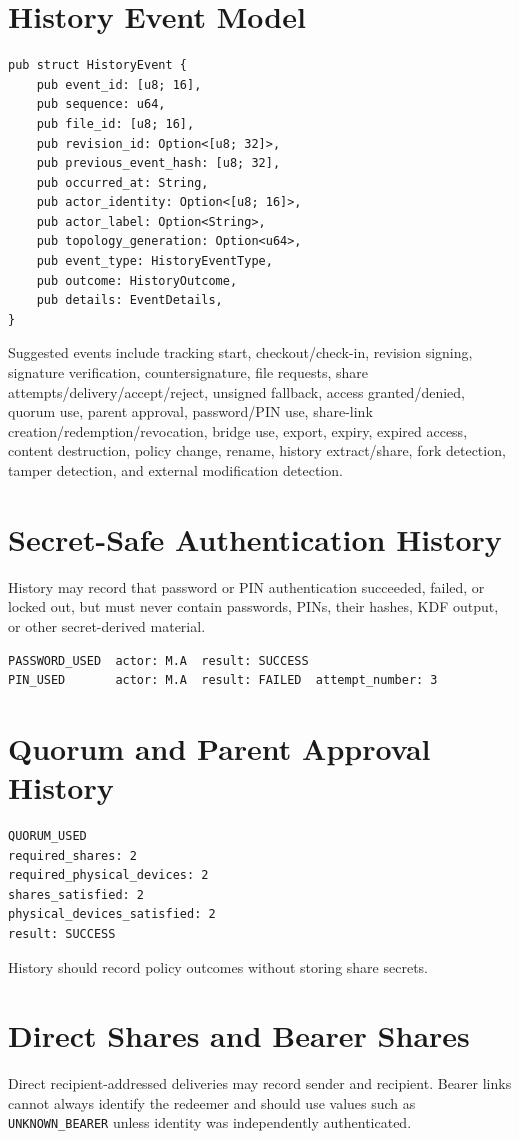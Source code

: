 \documentclass[11pt]{article}
\begin{document}
\section{History Event Model}
\begin{lstlisting}
pub struct HistoryEvent {
    pub event_id: [u8; 16],
    pub sequence: u64,
    pub file_id: [u8; 16],
    pub revision_id: Option<[u8; 32]>,
    pub previous_event_hash: [u8; 32],
    pub occurred_at: String,
    pub actor_identity: Option<[u8; 16]>,
    pub actor_label: Option<String>,
    pub topology_generation: Option<u64>,
    pub event_type: HistoryEventType,
    pub outcome: HistoryOutcome,
    pub details: EventDetails,
}
\end{lstlisting}

Suggested events include tracking start, checkout/check-in, revision signing, signature verification, countersignature, file requests, share attempts/delivery/accept/reject, unsigned fallback, access granted/denied, quorum use, parent approval, password/PIN use, share-link creation/redemption/revocation, bridge use, export, expiry, expired access, content destruction, policy change, rename, history extract/share, fork detection, tamper detection, and external modification detection.

\section{Secret-Safe Authentication History}
History may record that password or PIN authentication succeeded, failed, or locked out, but must never contain passwords, PINs, their hashes, KDF output, or other secret-derived material.
\begin{lstlisting}
PASSWORD_USED  actor: M.A  result: SUCCESS
PIN_USED       actor: M.A  result: FAILED  attempt_number: 3
\end{lstlisting}

\section{Quorum and Parent Approval History}
\begin{lstlisting}
QUORUM_USED
required_shares: 2
required_physical_devices: 2
shares_satisfied: 2
physical_devices_satisfied: 2
result: SUCCESS
\end{lstlisting}
History should record policy outcomes without storing share secrets.

\section{Direct Shares and Bearer Shares}
Direct recipient-addressed deliveries may record sender and recipient. Bearer links cannot always identify the redeemer and should use values such as \texttt{UNKNOWN\_BEARER} unless identity was independently authenticated.
\end{document}
